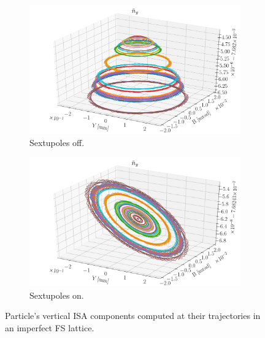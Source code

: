 \begin{figure}[!h]
	\centering
	\begin{subfigure}{\linewidth}
		\includegraphics[width=\linewidth]{images/decoh_sim/NY_VS_YB_IMPERFECT_UNOPT}
		\caption{Sextupoles off.}
	\end{subfigure}
	\begin{subfigure}{\linewidth}
		\includegraphics[width=\linewidth]{images/decoh_sim/NY_VS_YB_IMPERFECT_OPTIM}
		\caption{Sextupoles on.}
	\end{subfigure}
	\caption{Particle's vertical ISA components computed at their trajectories
          in an imperfect FS lattice.\label{decoh:fig:NY_on_traj}}
\end{figure}

